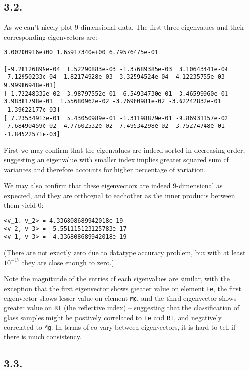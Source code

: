 \documentclass[11pt]{article}
\newcommand{\ilc}{\texttt}
\begin{document}
\subsection*{3.2.}

As we can't nicely plot 9-dimensional data. The first three eigenvalues and their corresponding eigenvectors are:

\begin{lstlisting}
3.00200916e+00 1.65917340e+00 6.79576475e-01

[-9.28126899e-04  1.52290883e-03 -1.37689385e-03  3.10643441e-04
-7.12950233e-04 -1.82174928e-03 -3.32594524e-04 -4.12235755e-03 9.99986948e-01]
[-1.72248332e-02 -3.98797552e-01 -6.54934730e-01 -3.46599960e-01
3.98381798e-01  1.55680962e-02 -3.76900981e-02 -3.62242832e-01 -1.39622177e-03]
[ 7.23534913e-01  5.43050989e-01 -1.31198879e-01 -9.86931157e-02
-7.68490459e-02  4.77602532e-02 -7.49534298e-02 -3.75274748e-01 -1.84522571e-03]
\end{lstlisting}

First we may confirm that the eigenvalues are indeed sorted in decreasing order, suggesting an eigenvalue with smaller index implies greater squared sum of variances and therefore accounts for higher percentage of variation.

We may also confirm that these eigenvectors are indeed 9-dimensional as expected, and they are orthognal to eachother as the inner products between them yield 0:

\begin{lstlisting}
<v_1, v_2> = 4.336808689942018e-19
<v_2, v_3> = -5.551115123125783e-17
<v_1, v_3> = -4.336808689942018e-19
\end{lstlisting}
(There are not exactly zero due to datatype accuracy problem, but with at least $10^{-17}$ they are close enough to zero.)

Note the magnitutde of the entries of each eigenvalues are similar, with the exception that the first eigenvector shows greater value on element \ilc{Fe}, the first eigenvector shows lesser value on element \ilc{Mg}, and the third eigenvector shows greater value on \ilc{RI} (the reflective index) -- suggesting that the classification of glass samples might be postively correlated to \ilc{Fe} and \ilc{RI}, and negatively correlated to \ilc{Mg}. In terms of co-vary between eigenvectors, it is hard to tell if there is much consistency.

\subsection*{3.3.}
\end{document}
